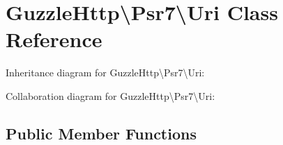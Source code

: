 \hypertarget{classGuzzleHttp_1_1Psr7_1_1Uri}{}\section{Guzzle\+Http\textbackslash{}Psr7\textbackslash{}Uri Class Reference}
\label{classGuzzleHttp_1_1Psr7_1_1Uri}


Inheritance diagram for Guzzle\+Http\textbackslash{}Psr7\textbackslash{}Uri\+:


Collaboration diagram for Guzzle\+Http\textbackslash{}Psr7\textbackslash{}Uri\+:
\subsection*{Public Member Functions}

